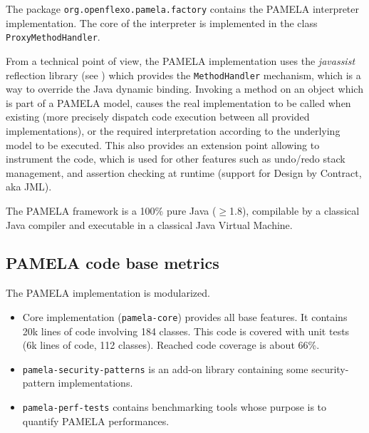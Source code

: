 The package \texttt{org.openflexo.pamela.factory} contains the PAMELA interpreter implementation. The core of the interpreter is implemented in the class \texttt{ProxyMethodHandler}.

From a technical point of view, the PAMELA implementation uses the \emph{javassist} reflection library (see \cite{shigueru2000}) which provides the \texttt{MethodHandler} mechanism, which is a way to override the Java dynamic binding. Invoking a method on an object which is part of a PAMELA model, causes the real implementation to be called when existing (more precisely dispatch code execution between all provided implementations), or the required interpretation according to the underlying model to be executed. This also provides an extension point allowing to instrument the code, which is used for other features such as undo/redo stack management, and assertion checking at runtime (support for Design by Contract, aka JML).

The PAMELA framework is a 100\% pure Java ($\geq$1.8), compilable by a classical Java compiler and executable in a classical Java Virtual Machine.

\subsection{PAMELA code base metrics}

The PAMELA implementation is modularized. 

\begin{itemize}
    \vspace{-0.2cm}\item Core implementation (\texttt{pamela-core}) provides all base features. %
    It contains 20k lines of code involving 184 classes. This code is covered with unit tests (6k lines of code, 112 classes). Reached code coverage is about 66\%.
    \vspace{-0.2cm}\item \texttt{pamela-security-patterns} is an add-on library containing some security-pattern implementations.
    \vspace{-0.2cm}\item \texttt{pamela-perf-tests} contains benchmarking tools whose purpose is to quantify PAMELA performances. 
\end{itemize}


